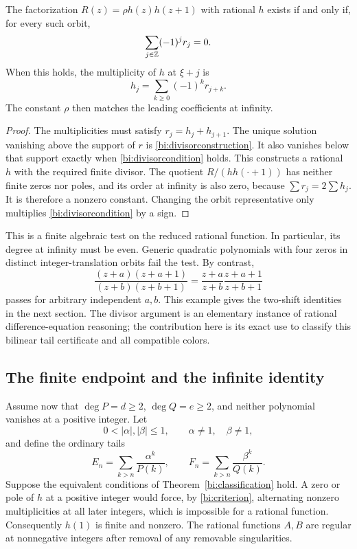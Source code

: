 \begin{proposition}
\label{bi:divisor}
The factorization $R(z)=\rho h(z)h(z+1)$ with rational $h$ exists
if and only if, for every such orbit,
\begin{equation}\label{bi:divisorcondition}
 \sum_{j\in\mathbb Z}(-1)^j r_j=0.
\end{equation}
When this holds, the multiplicity of $h$ at $\xi+j$ is
\begin{equation}\label{bi:divisorconstruction}
 h_j=\sum_{k\ge0}(-1)^k r_{j+k}.
\end{equation}
The constant $\rho$ then matches the leading coefficients at infinity.
\end{proposition}

\begin{proof}
The multiplicities must satisfy $r_j=h_j+h_{j+1}$.
The unique solution vanishing above the support of $r$ is
\eqref{bi:divisorconstruction}. It also vanishes below that support
exactly when \eqref{bi:divisorcondition} holds. This constructs a
rational $h$ with the required finite divisor. The quotient
$R/(hh(\cdot+1))$ has neither finite zeros nor poles, and its order
at infinity is also zero, because $\sum r_j=2\sum h_j$.
It is therefore a nonzero constant. Changing the orbit representative
only multiplies \eqref{bi:divisorcondition} by a sign.
\end{proof}

This is a finite algebraic test on the reduced rational function. In
particular, its degree at infinity must be even. Generic quadratic
polynomials with four zeros in distinct integer-translation orbits
fail the test. By contrast,
\begin{equation}\label{bi:adjacent-ratio}
 \frac{(z+a)(z+a+1)}{(z+b)(z+b+1)}
       =\frac{z+a}{z+b}\frac{z+a+1}{z+b+1}
\end{equation}
passes for arbitrary independent $a,b$. This example gives the
two-shift identities in the next section. The divisor argument is an
elementary instance of rational difference-equation reasoning; the
contribution here is its exact use to classify this bilinear tail
certificate and all compatible colors.

\subsection{The finite endpoint and the infinite identity}

Assume now that $\deg P=d\ge2$, $\deg Q=e\ge2$, and neither polynomial
vanishes at a positive integer. Let
\[
 0<|\alpha|,|\beta|\le1,\qquad \alpha\ne1,\quad\beta\ne1,
\]
and define the ordinary tails
\begin{equation}\label{bi:tails}
 E_n=\sum_{k>n}\frac{\alpha^k}{P(k)},\qquad
 F_n=\sum_{k>n}\frac{\beta^k}{Q(k)}.
\end{equation}
Suppose the equivalent conditions of Theorem~\ref{bi:classification}
hold. A zero or pole of $h$ at a positive integer would force, by
\eqref{bi:criterion}, alternating nonzero multiplicities at all later
integers, which is impossible for a rational function. Consequently
$h(1)$ is finite and nonzero. The rational functions $A,B$ are regular
at nonnegative integers after removal of any removable singularities.

